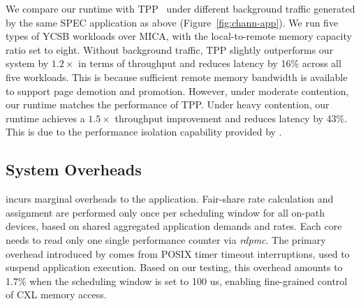 We compare our runtime with TPP~\cite{tpp-asplos23} under different background traffic generated by the same SPEC application as above (Figure~\ref{fig:chann-app}). We run five types of YCSB workloads over MICA, with the local-to-remote memory capacity ratio set to eight. Without background traffic, TPP slightly outperforms our system by $1.2\times$ in terms of throughput and reduces latency by 16\% across all five workloads. This is because sufficient remote memory bandwidth is available to support page demotion and promotion. However, under moderate contention, our runtime matches the performance of TPP. Under heavy contention, our runtime achieves a $1.5\times$ throughput improvement and reduces latency by 43\%. This is due to the performance isolation capability provided by \sys.




\subsection{System Overheads}
\label{subsec:eval-overheads}

\sys incurs marginal overheads to the application.
Fair-share rate calculation and assignment are performed only once per scheduling window for all on-path devices, based on shared aggregated application demands and rates. Each core needs to read only one single performance counter via \textit{rdpmc}. The primary overhead introduced by \sys comes from POSIX timer timeout interruptions, used to suspend application execution. Based on our testing, this overhead amounts to 1.7\% when the scheduling window is set to 100 us, enabling fine-grained control of CXL memory access.

